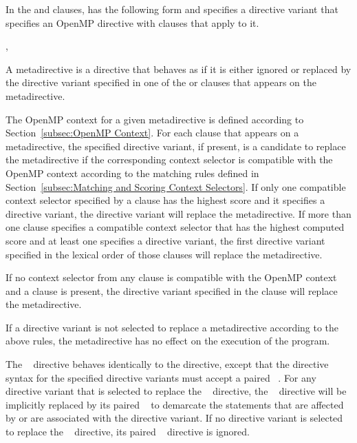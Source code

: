 In the  and  clauses, 
has the following form and specifies a directive variant that specifies an OpenMP
directive with clauses that apply to it.

\begin{indentedcodelist}
\plc{ directive-name [clause[ [},\plc{] clause] ... ]}
\end{indentedcodelist}

\descr
A metadirective is a directive that behaves as if it is either ignored or
replaced by the directive variant specified in one of the  or
 clauses that appears on the metadirective.

The OpenMP context for a given metadirective is defined according to
Section~\ref{subsec:OpenMP Context}.  For each  clause that appears
on a metadirective, the specified directive variant, if present, is a candidate
to replace the metadirective if the corresponding context selector is compatible
with the OpenMP context according to the matching rules defined in
Section~\ref{subsec:Matching and Scoring Context Selectors}.  If only one
compatible context selector specified by a  clause has the highest
score and it specifies a directive variant, the directive variant will replace
the metadirective. If more than one  clause specifies a compatible
context selector that has the highest computed score and at least one specifies
a directive variant, the first directive variant specified in the lexical order
of those  clauses will replace the metadirective.

If no context selector from any  clause is compatible with the
OpenMP context and a  clause is present, the directive variant
specified in the  clause will replace the metadirective.

If a directive variant is not selected to replace a metadirective according
to the above rules, the metadirective has no effect on the execution of the
program.

The ~ directive behaves identically to the
 directive, except that the directive syntax for the
specified directive variants must accept a paired ~.
For any directive variant that is selected to replace the
~ directive, the
~ directive will be implicitly replaced by its
paired ~ to demarcate the statements that are
affected by or are associated with the directive variant. If no directive
variant is selected to replace the ~
directive, its paired ~ directive is ignored.

